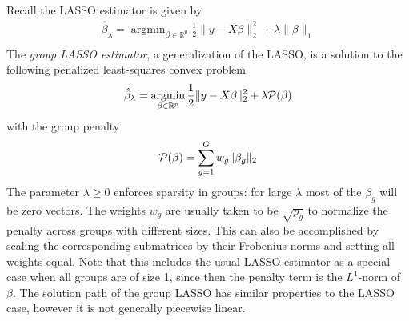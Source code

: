\documentclass{imsart}
\newcommand{\argmin}{\mathop{\mathrm{argmin}}}
\newcommand{\real}{\mathbb{R}}
\begin{document}
Recall the LASSO estimator is given by
\begin{equation}
\begin{aligned}
\label{eq:lasso}
\displaystyle \hat \beta_\lambda = \argmin_{\beta \in \real^p} \frac{1}{2} \| y - X \beta \|_2^2 +
   \lambda \| \beta \|_1 \\
\end{aligned}
\end{equation}
The \emph{group LASSO estimator}, a generalization of the LASSO,
 is a solution to the following penalized
least-squares convex problem
\begin{equation}
\begin{aligned}
\label{eq:gsoln}
\displaystyle \hat \beta_\lambda = \argmin_{\beta \in \real^p} \frac{1}{2} \| y - X \beta \|_2^2 +
   \lambda {\cal P}(\beta) \\
\end{aligned}
\end{equation}
with the group penalty
\begin{equation}
  \begin{aligned}
  \label{eq:gpen}
    {\cal P}(\beta)&= \sum_{g=1}^G w_g \| \beta_g \|_2 \\
  \end{aligned}
\end{equation}
The parameter $\lambda \geq 0$ enforces sparsity in groups: for large
$\lambda$ most of the $\beta_g$ will be zero vectors. The weights
$w_g$ are usually taken to be $\sqrt {p_g}$ to normalize the penalty
across groups with different sizes.  This can also be accomplished
by scaling the corresponding submatrices by their Frobenius norms
and setting all weights equal.
Note that this includes the usual LASSO estimator as a
special case when all groups are of size 1, since then the
penalty term is the $L^1$-norm of $\beta$. The solution path of the group
LASSO has similar properties to the LASSO case, however it is not
generally piecewise linear.
\end{document}
